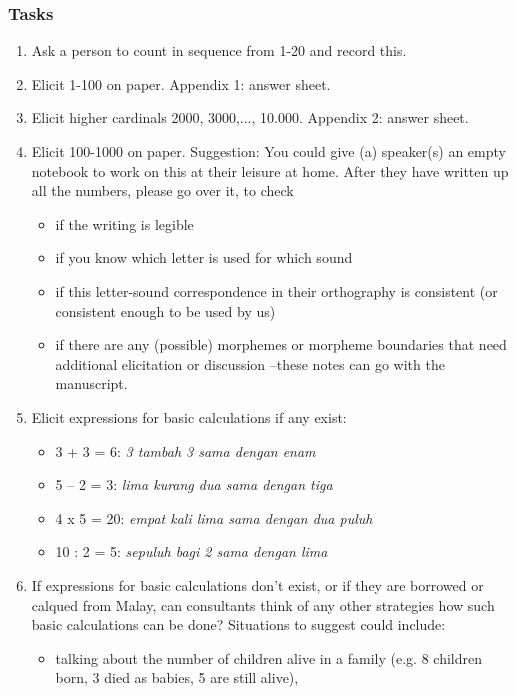 \subsubsection*{Tasks}
\begin{enumerate}
\item Ask a person to count in sequence from 1-20 and record this.
\item Elicit 1-100 on paper. Appendix 1: answer sheet.
\item Elicit higher cardinals 2000, 3000,..., 10.000. Appendix 2: answer sheet. 
\item Elicit 100-1000 on paper. Suggestion: You could give (a) speaker(s) an empty  notebook to work on this at their leisure at home. After they have written up all the numbers, please go over it, to check   
  \begin{itemize}
  \item if the writing is legible 
  \item if you know which letter is used for which sound
  \item if this letter-sound correspondence in their orthography is consistent (or consistent enough to be used by us) 
  \item if there are any (possible) morphemes or morpheme boundaries that need additional elicitation or discussion --these notes can go with the manuscript.
  \end{itemize}
\item Elicit expressions for basic calculations if any exist: 
  \begin{itemize}
  \item 3 + 3 = 6: \textit{3 tambah 3 sama dengan enam}
  \item 5 -- 2 = 3: \textit{lima kurang dua sama dengan tiga}
  \item 4 x 5 = 20: \textit{empat kali lima sama dengan dua puluh}
  \item 10 : 2 = 5: \textit{sepuluh bagi 2 sama dengan lima} 
  \end{itemize}
\item If expressions for basic calculations don't exist, or if they are borrowed or calqued from Malay, can consultants think of any other strategies how such basic calculations can be done? Situations to suggest could include: 
  \begin{itemize}
  \item talking about the number of children alive in a family (e.g. 8 children born, 3 died as babies, 5 are still alive), 

\end{itemize}
\end{enumerate}
